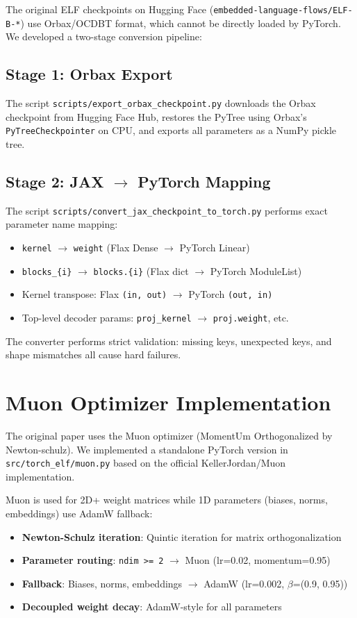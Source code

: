 \documentclass[11pt]{article}
\begin{document}
The original ELF checkpoints on Hugging Face (\texttt{embedded-language-flows/ELF-B-*})
use Orbax/OCDBT format, which cannot be directly loaded by PyTorch. We developed a
two-stage conversion pipeline:

\subsection{Stage 1: Orbax Export}

The script \texttt{scripts/export\_orbax\_checkpoint.py} downloads the Orbax checkpoint
from Hugging Face Hub, restores the PyTree using Orbax's \texttt{PyTreeCheckpointer}
on CPU, and exports all parameters as a NumPy pickle tree.

\subsection{Stage 2: JAX $\to$ PyTorch Mapping}

The script \texttt{scripts/convert\_jax\_checkpoint\_to\_torch.py} performs exact
parameter name mapping:
\begin{itemize}
\item \texttt{kernel} $\to$ \texttt{weight} (Flax Dense $\to$ PyTorch Linear)
\item \texttt{blocks\_\{i\}} $\to$ \texttt{blocks.\{i\}} (Flax dict $\to$ PyTorch ModuleList)
\item Kernel transpose: Flax \texttt{(in, out)} $\to$ PyTorch \texttt{(out, in)}
\item Top-level decoder params: \texttt{proj\_kernel} $\to$ \texttt{proj.weight}, etc.
\end{itemize}

The converter performs strict validation: missing keys, unexpected keys, and shape
mismatches all cause hard failures.

\section{Muon Optimizer Implementation}

The original paper uses the Muon optimizer (MomentUm Orthogonalized by Newton-schulz).
We implemented a standalone PyTorch version in \texttt{src/torch\_elf/muon.py} based
on the official KellerJordan/Muon implementation.

Muon is used for 2D+ weight matrices while 1D parameters (biases, norms, embeddings)
use AdamW fallback:

\begin{itemize}
\item \textbf{Newton-Schulz iteration}: Quintic iteration for matrix orthogonalization
\item \textbf{Parameter routing}: \texttt{ndim >= 2} $\to$ Muon (lr=0.02, momentum=0.95)
\item \textbf{Fallback}: Biases, norms, embeddings $\to$ AdamW (lr=0.002, $\beta$=(0.9, 0.95))
\item \textbf{Decoupled weight decay}: AdamW-style for all parameters
\end{itemize}
\end{document}
